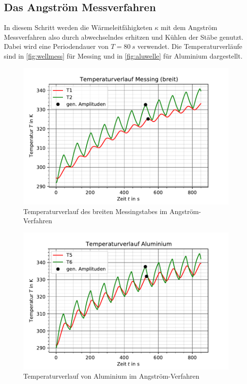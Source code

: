 \subsection{Das Angström Messverfahren}
\label{sec:auswertung2}
In diesem Schritt werden die Wärmeleitfähigketen $\kappa$ mit dem Angström Messverfahren also durch
abwechselndes erhitzen und Kühlen der Stäbe genutzt. Dabei wird eine Periodendauer von $T=\SI[]{80}[]{s}$
verwendet. Die Temperaturverläufe sind in \autoref{fig:wellmess} für Messing und in \autoref{fig:aluwelle} für Aluminium dargestellt.
\begin{figure}
    \centering
    \includegraphics{wellemessing.pdf}
    \caption{Temperaturverlauf des breiten Messingstabes im Angström-Verfahren}
    \label{fig:wellmess}
  \end{figure}
  \begin{figure}
    \centering
    \includegraphics{wellenalu.pdf}
    \caption{Temperaturverlauf von Aluminium im Angström-Verfahren}
    \label{fig:aluwelle}
  \end{figure}
